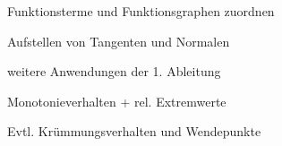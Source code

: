\documentclass[
    ngerman,
    color=1b,
    load_common,
    leqno,
    boxarc,
    solution=true,
]{rubos-tuda-template}
\begin{document}
\begin{task}[points=3]{Funktionsterme und Funktionsgraphen zuordnen}
    
\end{task}
\begin{task}[points=1]{Aufstellen von Tangenten und Normalen}

\end{task}
\begin{task}[points=1]{weitere Anwendungen der 1. Ableitung}

\end{task}
\begin{task}[points=1]{Monotonieverhalten + rel. Extremwerte}

\end{task}
\begin{task}[points=1]{Evtl. Krümmungsverhalten und Wendepunkte}

\end{task}








\end{document}

